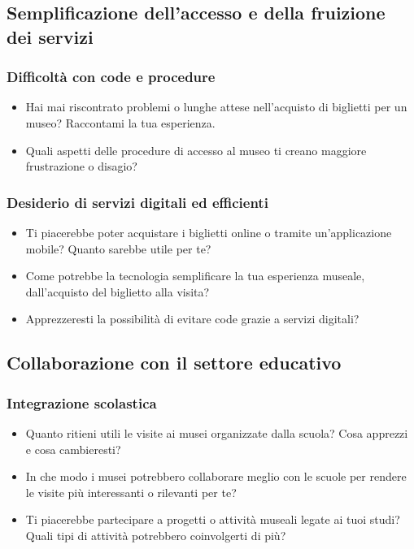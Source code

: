 \documentclass{article}
\begin{document}
\subsection{Semplificazione dell’accesso e della fruizione dei servizi}

\subsubsection{Difficoltà con code e procedure}

\begin{itemize}
    \item Hai mai riscontrato problemi o lunghe attese nell’acquisto di biglietti per un museo? Raccontami la tua esperienza.
    \item Quali aspetti delle procedure di accesso al museo ti creano maggiore frustrazione o disagio?
\end{itemize}

\subsubsection{Desiderio di servizi digitali ed efficienti}

\begin{itemize}
    \item Ti piacerebbe poter acquistare i biglietti online o tramite un’applicazione mobile? Quanto sarebbe utile per te?
    \item Come potrebbe la tecnologia semplificare la tua esperienza museale, dall’acquisto del biglietto alla visita?
    \item Apprezzeresti la possibilità di evitare code grazie a servizi digitali?
\end{itemize}

\subsection{Collaborazione con il settore educativo}

\subsubsection{Integrazione scolastica}

\begin{itemize}
    \item Quanto ritieni utili le visite ai musei organizzate dalla scuola? Cosa apprezzi e cosa cambieresti?
    \item In che modo i musei potrebbero collaborare meglio con le scuole per rendere le visite più interessanti o rilevanti per te?
    \item Ti piacerebbe partecipare a progetti o attività museali legate ai tuoi studi? Quali tipi di attività potrebbero coinvolgerti di più?
\end{itemize}
\end{document}
